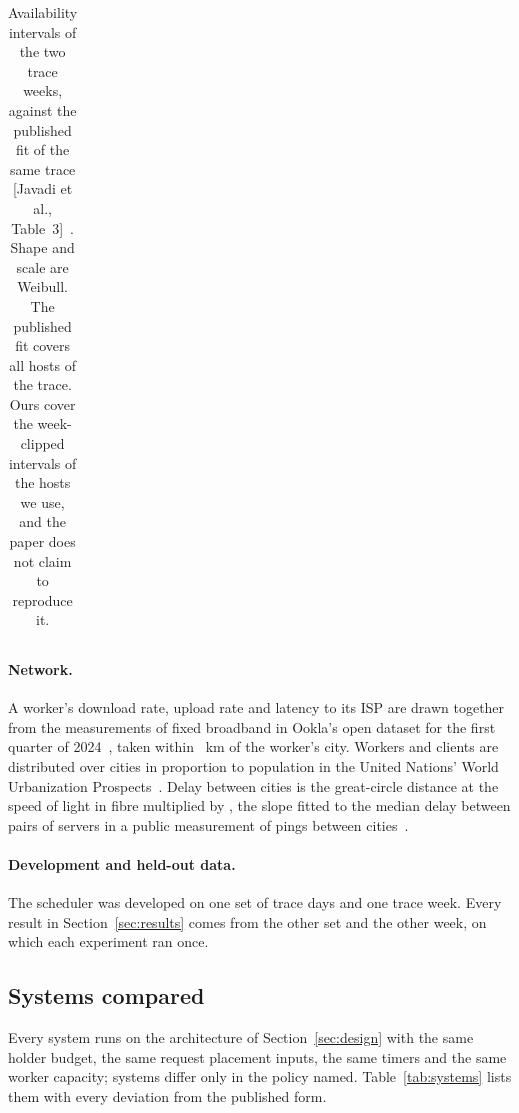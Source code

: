 \begin{table}[t]
\caption{Availability intervals of the two trace weeks, against the published fit of the same trace
[Javadi et al., Table~3]~\cite{javadi2009seti}. Shape and scale are Weibull. The published fit covers all hosts of
the trace. Ours cover the week-clipped intervals of the hosts we use, and the paper does not claim to reproduce it.}
\label{tab:traces}
\small
\begin{tabular}{@{}lrrrrr@{}}
\toprule

\end{tabular}
\end{table}

\paragraph{Network.} A worker's download rate, upload rate and latency to its ISP are drawn together from the
measurements of fixed broadband in Ookla's open dataset for the first quarter of 2024~\cite{ookla2024}, taken within
\VOoklaRadiusKm{}~km of the worker's city. Workers and clients are distributed over cities in proportion to population
in the United Nations' World Urbanization Prospects~\cite{wup2025}. Delay between cities is the great-circle distance
at the speed of light in fibre multiplied by \VRouteFactor{}, the slope fitted to the median delay between pairs of
servers in a public measurement of pings between cities~\cite{wonderproxy2020}.

\paragraph{Development and held-out data.} The scheduler was developed on one set of trace days and one trace week.
Every result in Section~\ref{sec:results} comes from the other set and the other week, on which each experiment ran
once.

\subsection{Systems compared}
\label{sec:systems}

Every system runs on the architecture of Section~\ref{sec:design} with the same holder budget, the same request
placement inputs, the same timers and the same worker capacity; systems differ only in the policy named.
Table~\ref{tab:systems} lists them with every deviation from the published form.

